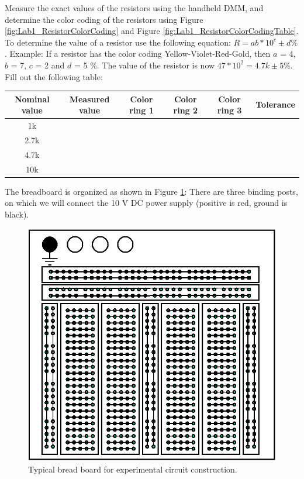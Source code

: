 \documentclass[11pt,letterpaper]{article}
\begin{document}
Measure the exact values of the resistors using the handheld DMM, and determine the color coding of the resistors using Figure \ref{fig:Lab1_ResistorColorCoding} and Figure \ref{fig:Lab1_ResistorColorCodingTable}. To determine the value of a resistor use the following equation: $R = ab * 10^c \pm d \% $. Example: If a resistor has the color coding Yellow-Violet-Red-Gold, then $a$ = 4, $b$ = 7, $c$ = 2 and $d$ = 5 \%. The value of the resistor is now $47 * 10^2 = 4.7k \pm 5 \%$. Fill out the following table:
\begin{center}
\begin{tabular}{|c|c|c|c|c|c|}
\hline Nominal value & Measured value  & Color ring 1  & Color ring 2 & Color ring 3 & Tolerance \\ 
\hline 1k &  &  &  &  &  \\ 
\hline 2.7k  &  &  &  &  &  \\ 
\hline 4.7k &  &  &  &  &  \\ 
\hline 10k &  &  &  &  &  \\ 
\hline 
\end{tabular}
\end{center}

The breadboard is organized as shown in Figure \ref{fig:Lab1_BreadBoard}: There are three binding posts, on which we will connect the 10 V DC power supply (positive is red, ground is black).\\

\begin{figure}
\centering
\includegraphics[width=0.5\linewidth]{Lab1_BreadBoard}
\caption{Typical bread board for experimental circuit construction.}
\label{fig:Lab1_BreadBoard}
\end{figure}
\end{document}
